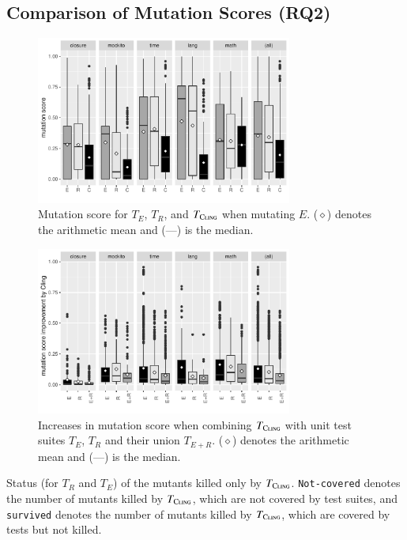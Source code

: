 \subsection{Comparison of Mutation Scores (RQ2)}
 
 
\begin{figure}[t]
    \centering
    \includegraphics[width=0.75\textwidth]{papers/cling/figures/mutation-coverage-boxplot.pdf}
    \caption{Mutation score for $T_E$, $T_R$, and $T_\textsc{Cling}$ when mutating $E$. ($\diamond$) denotes the arithmetic mean and (---) is the median.}
    \label{fig:mutation:boxplot}
\end{figure}

\begin{figure}[t]
    \centering
    \includegraphics[width=0.75\textwidth]{papers/cling/figures/mutation-diff-boxplot.pdf}
    \caption{Increases in mutation score when combining $T_\textsc{Cling}$ with unit test suites $T_E$, $T_R$ and their union $T_{E+R}$. ($\diamond$) denotes the arithmetic mean and (---) is the median.}
    \label{fig:mutation:diff:boxplot} 
\end{figure}

\begin{table} [t]
	\center
    \caption{Status (for $T_R$ and $T_E$) of the mutants killed only by $T_{\textsc{Cling}}$. \texttt{Not-covered} denotes the number of mutants killed by $T_{\textsc{Cling}}$, which are not covered by \evosuite test suites, and \texttt{survived} denotes the number of mutants killed by $T_{\textsc{Cling}}$, which are covered by \evosuite tests but not killed.}
	\label{tab:mutant-status-table}
	
\end{table} 



